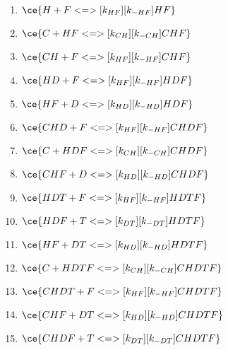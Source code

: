 \begin{enumerate}
\item $\ce{H + F <=>[k_{HF}][k_{-HF}] HF}$ %
\item $\ce{C + HF <=>[k_{CH}][k_{-CH}] CHF}$ %
\item $\ce{CH + F <=>[k_{HF}][k_{-HF}] CHF}$ %
\item $\ce{HD + F <=>[k_{HF}][k_{-HF}] HDF}$ %
\item $\ce{HF + D <=>[k_{HD}][k_{-HD}] HDF}$ %
\item $\ce{CHD + F <=>[k_{HF}][k_{-HF}] CHDF}$ %
\item $\ce{C + HDF <=>[k_{CH}][k_{-CH}] CHDF}$ %
\item $\ce{CHF + D <=>[k_{HD}][k_{-HD}] CHDF}$ %
\item $\ce{HDT + F <=>[k_{HF}][k_{-HF}] HDTF}$ %
\item $\ce{HDF + T <=>[k_{DT}][k_{-DT}] HDTF}$ %
\item $\ce{HF + DT <=>[k_{HD}][k_{-HD}] HDTF}$ %
\item $\ce{C + HDTF <=>[k_{CH}][k_{-CH}] CHDTF}$ %
\item $\ce{CHDT + F <=>[k_{HF}][k_{-HF}] CHDTF}$ %
\item $\ce{CHF + DT <=>[k_{HD}][k_{-HD}] CHDTF}$ %
\item $\ce{CHDF + T <=>[k_{DT}][k_{-DT}] CHDTF}$ %

\end{enumerate}